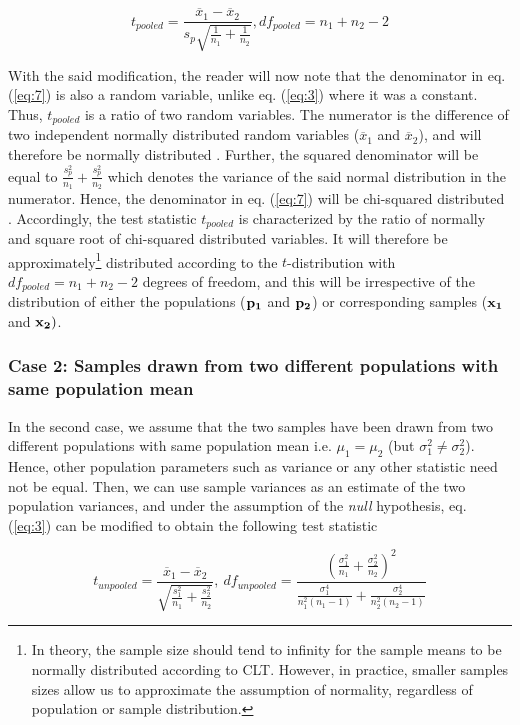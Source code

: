 \documentclass[10pt,final,Twcolumn]{IEEEtran}
\begin{document}
\begin{equation} \label{eq:7}
	t_{pooled} = \frac{\overline {x}_1 - \overline {x}_2}{s_p\sqrt {\frac{1}{{n_1}}+\frac{1}{{n_2}}}}, df_{pooled} = n_1+n_2-2
\end{equation}

With the said modification, the reader will now note that the denominator in eq. (\ref{eq:7}) is also a random variable, unlike eq. (\ref{eq:3}) where it was a constant. Thus, $t_{pooled}$ is a ratio of two random variables. The numerator is the difference of two independent normally distributed random variables ($\overline {x}_1$ and $\overline {x}_2$), and will therefore be normally distributed \cite{roussas2003introduction}. Further, the squared denominator will be equal to ${\frac{s_p^2}{{n_1}}+\frac{s_p^2}{{n_2}}}$ which denotes the variance of the said normal distribution in the numerator. Hence, the denominator in eq. (\ref{eq:7}) will be chi-squared distributed \cite{roussas2003introduction}. Accordingly, the test statistic $t_{pooled}$ is characterized by the ratio of normally and square root of chi-squared distributed variables. It will therefore be approximately\footnote{In theory, the sample size should tend to infinity for the sample means to be normally distributed according to CLT. However, in practice, smaller samples sizes allow us to approximate the assumption of normality, regardless of population or sample distribution.} distributed according to the $t$-distribution \cite{roussas2003introduction} with $df_{pooled} = n_1+n_2-2$ degrees of freedom, and this will be irrespective of the distribution of either the populations (${\it\bf {p_1}}$ and ${\it\bf  {p_2}}$) or corresponding samples (${\it\bf  {x_1}}$ and ${\it\bf  {x_2}})$.
\subsubsection{Case 2: Samples drawn from two different populations with same population mean}

In the second case, we assume that the two samples have been drawn from two different populations with same population mean i.e. $\mu_1 = \mu_2$ (but $\sigma_1^2 \neq \sigma_2^2$). Hence, other population parameters such as variance or any other statistic need not be equal.  Then, we can use sample variances as an estimate of the two population variances, and under the assumption of the {\it{null}} hypothesis, eq. (\ref{eq:3}) can be modified to obtain the following test statistic

\begin{equation} \label{t_unpooled}
	t_{unpooled} = \frac{\overline {x}_1 - \overline {x}_2}{\sqrt {\frac{s_1^2}{{n_1}}+\frac{s_2^2}{{n_2}}}}, \: df_{unpooled} = \frac{\left(\frac{\sigma_1^2}{n_1}+\frac{\sigma_2^2}{n_2} \right)^2}{{\frac{\sigma_1^4}{n_1^2(n_1-1)}+\frac{\sigma_2^4}{n_2^2(n_2-1)}}} 
%	
\end{equation}
\end{document}
